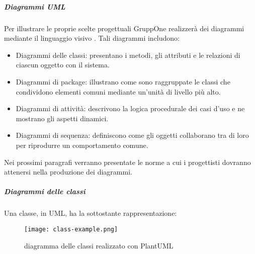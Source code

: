 \documentclass[../../norme-di-progetto.tex]{subfiles}
\begin{document}
\subparagraph{Diagrammi UML}%
\label{subp:diagrammi_UML}
Per illustrare le proprie scelte progettuali GruppOne realizzerà dei diagrammi mediante il linguaggio visivo .
Tali diagrammi includono:
\begin{itemize}
  \item Diagrammi delle classi: presentano i metodi, gli attributi e le relazioni di ciascun oggetto con il sistema.
  \item Diagrammi di package: illustrano come sono raggruppate le classi che condividono elementi comuni mediante un'unità di livello più alto.
  \item Diagrammi di attività: descrivono la logica procedurale dei casi d'uso e ne mostrano gli aspetti dinamici.
  \item Diagrammi di sequenza: definiscono come gli oggetti collaborano tra di loro per riprodurre un comportamento comune.
\end{itemize}
Nei prossimi paragrafi verranno presentate le norme a cui i progettisti dovranno attenersi nella produzione dei diagrammi.
\subparagraph{Diagrammi delle classi}%
\label{subp:diagrammi_delle_classi}
Una classe, in UML, ha la sottostante rappresentazione:
\begin{figure}[H]%
  \label{fig:classe_uml}
  \texttt{[image: class-example.png]}
  \centering
  \caption{diagramma delle classi realizzato con PlantUML}
\end{figure}
\end{document}
